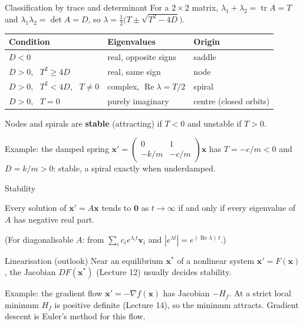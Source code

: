 \documentclass[10pt]{wosm-slides}
\newcommand{\vx}{\mathbf{x}}
\DeclareRobustCommand{\vv}{\mathbf{v}}
\begin{document}
\begin{frame}{Classification by trace and determinant}
  For a $2 \times 2$ matrix, $\lambda_1 + \lambda_2 = \operatorname{tr} A = T$ and $\lambda_1 \lambda_2 = \det A = D$, so
  $\lambda = \frac12\bigl(T \pm \sqrt{T^2 - 4D}\bigr)$.
  \pause
  \begin{center}
    \begin{tabular}{lll}
      \toprule
      Condition & Eigenvalues & Origin \\
      \midrule
      $D < 0$ & real, opposite signs & saddle \\
      $D > 0$, \ $T^2 \ge 4D$ & real, same sign & node \\
      $D > 0$, \ $T^2 < 4D$, \ $T \ne 0$ & complex, $\operatorname{Re}\lambda = T/2$ & spiral \\
      $D > 0$, \ $T = 0$ & purely imaginary & centre (closed orbits) \\
      \bottomrule
    \end{tabular}
  \end{center}
  \pause
  Nodes and spirals are \textbf{stable} (attracting) if $T < 0$ and unstable if $T > 0$.
  \pause
  {\small Example: the damped spring $\vx' = \begin{pmatrix} 0 & 1 \\ -k/m & -c/m \end{pmatrix}\vx$ has $T = -c/m < 0$ and
  $D = k/m > 0$: stable, a spiral exactly when underdamped.\par}
\end{frame}

\begin{frame}{Stability}
  \begin{theorem}
    Every solution of $\vx' = A\vx$ tends to $\mathbf 0$ as $t \to \infty$ if and only if every eigenvalue of
    $A$ has negative real part.
  \end{theorem}
  {\small (For diagonalisable $A$: from $\sum_i c_i e^{\lambda_i t} \vv_i$ and $|e^{\lambda t}| = e^{(\operatorname{Re}\lambda)\, t}$.)\par}
  \pause
  \begin{block}{Linearisation (outlook)}
    Near an equilibrium $\vx^*$ of a nonlinear system $\vx' = F(\vx)$, the Jacobian $DF(\vx^*)$ (Lecture 12)
    usually decides stability.
  \end{block}
  \pause
  {\small Example: the gradient flow $\vx' = -\nabla f(\vx)$ has Jacobian $-H_f$. At a strict local minimum
  $H_f$ is positive definite (Lecture 14), so the minimum attracts. Gradient descent is Euler's method
  for this flow.\par}
\end{frame}
\end{document}
